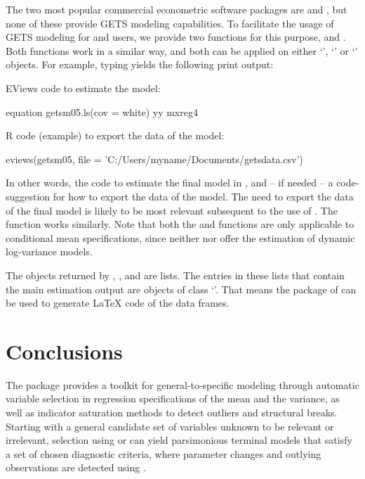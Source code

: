 \documentclass[article,nojss]{jss}
\begin{document}
The two most popular commercial econometric software packages are
 \citep{EViews2016v9.5} and 
\citep{STATA2017}, but none of these provide GETS modeling
capabilities. To facilitate the usage of GETS modeling for
 and  users, we provide two functions
for this purpose,  and . Both functions work
in a similar way, and both can be applied on either `',
`' or `' objects. For example, typing
 yields the following print output:
%
\begin{CodeChunk}
\begin{CodeOutput}
EViews code to estimate the model:

  equation getsm05.ls(cov = white) yy mxreg4 

R code (example) to export the data of the model:

  eviews(getsm05, file = 'C:/Users/myname/Documents/getsdata.csv')
\end{CodeOutput}
\end{CodeChunk}
%
In other words, the code to estimate the final model in
, and -- if needed -- a code-suggestion for how to
export the data of the model. The need to export the data of the final
model is likely to be most relevant subsequent to the use of
. The  function works similarly. Note that both
the  and  functions are only applicable to
conditional mean specifications, since neither  nor
 offer the estimation of dynamic log-variance models.

The objects returned by , ,  and
 are lists. The entries in these lists that contain the
main estimation output are objects of class `'. That
means the  package  of \cite{Dahl2016} can be
used to generate \LaTeX{} code of the data frames.

\section{Conclusions}
\label{sec:conclusions}

The  package  provides a toolkit for
general-to-specific modeling through automatic variable selection in
regression specifications of the mean and the variance, as well as
indicator saturation methods to detect outliers and structural
breaks. Starting with a general candidate set of variables unknown to
be relevant or irrelevant, selection using  or
 can yield parsimonious terminal models that satisfy a set
of chosen diagnostic criteria, where parameter changes and outlying
observations are detected using .
	
\end{document}
